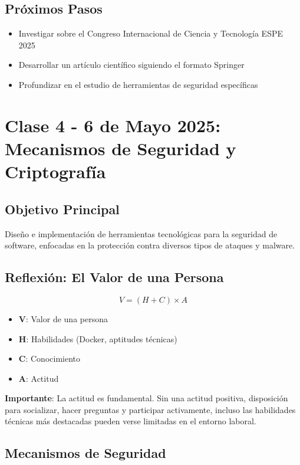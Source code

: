 \documentclass[12pt,a4paper]{article}
\begin{document}
\subsection{Próximos Pasos}
\begin{itemize}
    \item Investigar sobre el Congreso Internacional de Ciencia y Tecnología ESPE 2025
    \item Desarrollar un artículo científico siguiendo el formato Springer
    \item Profundizar en el estudio de herramientas de seguridad específicas
\end{itemize}

\section{Clase 4 - 6 de Mayo 2025: Mecanismos de Seguridad y Criptografía}
\subsection{Objetivo Principal}
Diseño e implementación de herramientas tecnológicas para la seguridad de software, enfocadas en la protección contra diversos tipos de ataques y malware.

\subsection{Reflexión: El Valor de una Persona}
\begin{equation*}
V = (H + C) \times A
\end{equation*}
\begin{itemize}
    \item \textbf{V}: Valor de una persona
    \item \textbf{H}: Habilidades (Docker, aptitudes técnicas)
    \item \textbf{C}: Conocimiento
    \item \textbf{A}: Actitud
\end{itemize}

\noindent\textbf{Importante}: La actitud es fundamental. Sin una actitud positiva, disposición para socializar, hacer preguntas y participar activamente, incluso las habilidades técnicas más destacadas pueden verse limitadas en el entorno laboral.

\subsection{Mecanismos de Seguridad}
\end{document}
